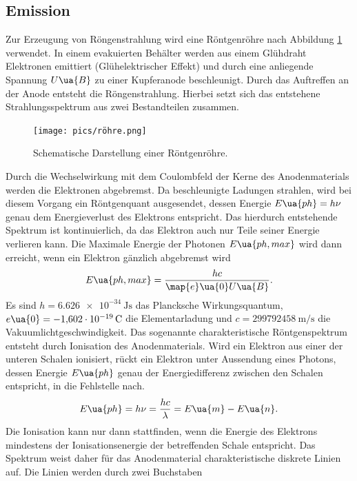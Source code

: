 \subsection{Emission}
Zur Erzeugung von Röngenstrahlung wird eine Röntgenröhre nach Abbildung \ref{fig: röhre} verwendet. In einem
evakuierten Behälter werden aus einem Glühdraht Elektronen emittiert (Glühelektrischer Effekt) und durch eine
anliegende Spannung $U\ua{B}$ zu einer Kupferanode beschleunigt. Durch das Auftreffen an der Anode
entsteht die Röngenstrahlung. Hierbei setzt sich das entstehene Strahlungsspektrum aus zwei
Bestandteilen zusammen.\\
\begin{figure}
  \centering
  \texttt{[image: pics/röhre.png]}
  \caption{Schematische Darstellung einer Röntgenröhre\cite{anleitung602i}.}
  \label{fig: röhre}
\end{figure}
Durch die Wechselwirkung mit dem Coulombfeld der Kerne des Anodenmaterials werden die Elektronen abgebremst. Da beschleunigte Ladungen strahlen,
wird bei diesem
Vorgang ein Röntgenquant ausgesendet, dessen Energie $E\ua{ph} = h\nu$ genau dem Energieverlust des Elektrons
entspricht. Das hierdurch entstehende Spektrum ist kontinuierlich, da das Elektron auch nur Teile seiner
Energie verlieren kann. Die Maximale Energie der Photonen $E\ua{ph, max}$ wird dann erreicht,
wenn ein Elektron gänzlich abgebremst wird
\begin{equation}
  E\ua{ph, max} = \frac{h c}{\map{e}\ua{0}U\ua{B}}.
  \label{eq: E_max}
\end{equation}
Es sind $h=\SI{6.626e-34}{\joule\second}$ das Plancksche Wirkungsquantum, $e\ua{0}=\SI{-1.602e-19}{\coulomb}$ die Elementarladung und
$c=\SI{299792458}{\meter\per\second}$ die Vakuumlichtgeschwindigkeit.
Das sogenannte charakteristische Röntgenspektrum entsteht durch Ionisation des Anodenmaterials.
Wird ein Elektron aus einer der unteren Schalen ionisiert, rückt ein Elektron unter Aussendung eines
Photons, dessen Energie $E\ua{ph}$ genau der Energiedifferenz zwischen den Schalen entspricht, in die Fehlstelle nach.
\begin{equation}
  E\ua{ph} = h\nu = \frac{h c}{\lambda} = E\ua{m} - E\ua{n}.
  \label{eq: photonenenergie}
\end{equation}
Die Ionisation kann nur dann stattfinden, wenn die Energie des Elektrons mindestens der Ionisationsenergie der betreffenden Schale entspricht.
Das Spektrum weist daher für das Anodenmaterial charakteristische diskrete Linien auf. Die Linien werden durch zwei Buchstaben

